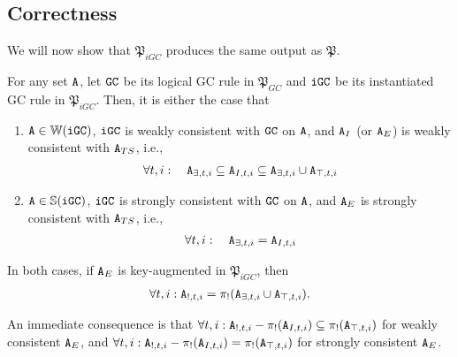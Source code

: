 \subsection{Correctness}
We will now show that $\mathfrak{P}_{iGC}$ produces the same output as $\mathfrak{P}$.

\begin{thm}
\label{thm:instantiated_correctness}
For any set $\tt{A}$, let $\tt{GC}$ be its logical GC rule in $\mathfrak{P}_{GC}$ and $\tt{iGC}$ be its instantiated GC rule in $\mathfrak{P}_{iGC}$.
Then, it is either the case that
\begin{enumerate}
\item $\tt{A} \in \mathbb{W}(\tt{iGC})$, $\tt{iGC}$ is weakly consistent with $\tt{GC}$ on $\tt{A}$, and $\tt{A}_I$ (or $\tt{A}_E$) is weakly consistent with $\tt{A}_{TS}$, i.e.,
\begin{align}
\forall t, i: \quad \tt{A}_{\exists,t,i} \subseteq \tt{A}_{I,t,i} \subseteq \tt{A}_{\exists,t,i} \cup \tt{A}_{\top,t,i} \label{eq:thm_instantiated_correctness_set}
\end{align}
\item $\tt{A} \in \mathbb{S}(\tt{iGC})$, $\tt{iGC}$ is strongly consistent with $\tt{GC}$ on $\tt{A}$, and $\tt{A}_E$ is strongly consistent with $\tt{A}_{TS}$, i.e.,
\begin{align}
\forall t, i: \quad \tt{A}_{\exists,t,i} = \tt{A}_{I,t,i} \label{eq:thm_instantiated_correctness_set_strong}
\end{align}
\end{enumerate}
In both cases, if $\tt{A}_E$ is key-augmented in $\mathfrak{P}_{iGC}$, then
\begin{align}
\forall t, i : \tt{A}_{!,t,i} = \pi_!(\tt{A}_{\exists,t,i} \cup \tt{A}_{\top,t,i}) \label{eq:thm_instantiated_correctness_key}.
\end{align}
\end{thm}
\begin{rmk}
An immediate consequence is that $\forall t, i: \tt{A}_{!,t,i} - \pi_!(\tt{A}_{I,t,i}) \subseteq \pi_!(\tt{A}_{\top,t,i})$ for weakly consistent $\tt{A}_E$, and $\forall t, i: \tt{A}_{!,t,i} - \pi_!(\tt{A}_{I,t,i}) = \pi_!(\tt{A}_{\top,t,i})$ for strongly consistent $\tt{A}_E$.
\end{rmk}
